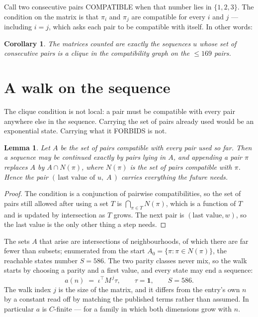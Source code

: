 \documentclass[11pt,a4paper]{article}
\theoremstyle{plain}
\newtheorem{lemma}[theorem]{Lemma}
\newtheorem{corollary}[theorem]{Corollary}
\theoremstyle{definition}
\begin{document}
Call two consecutive pairs COMPATIBLE when that number lies in $\{1,2,3\}$. The condition on the
matrix is that $\pi_i$ and $\pi_j$ are compatible for every $i$ and $j$ --- including $i=j$,
which asks each pair to be compatible with itself. In other words:

\begin{corollary}
The matrices counted are exactly the sequences $u$ whose set of consecutive pairs is a clique in
the compatibility graph on the $\le 169$ pairs.
\end{corollary}

\section{A walk on the sequence}

The clique condition is not local: a pair must be compatible with every pair anywhere else in
the sequence. Carrying the set of pairs already used would be an exponential state. Carrying
what it FORBIDS is not.

\begin{lemma}\label{lem:lump}
Let $A$ be the set of pairs compatible with every pair used so far. Then a sequence may be
continued exactly by pairs lying in $A$, and appending a pair $\pi$ replaces $A$ by
$A\cap N(\pi)$, where $N(\pi)$ is the set of pairs compatible with $\pi$. Hence the pair
$(\,\text{last value of }u,\;A\,)$ carries everything the future needs.
\end{lemma}

\begin{proof}
The condition is a conjunction of pairwise compatibilities, so the set of pairs still allowed
after using a set $T$ is $\bigcap_{\pi\in T}N(\pi)$, which is a function of $T$ and is updated
by intersection as $T$ grows. The next pair is $(\text{last value},w)$, so the last value is
the only other thing a step needs.
\end{proof}

The sets $A$ that arise are intersections of neighbourhoods, of which there are far fewer than
subsets; enumerated from the start $A_0=\{\pi:\pi\in N(\pi)\}$, the reachable states number
$S=586$. The two parity classes never mix, so the walk starts by choosing a parity and a first
value, and every state may end a sequence:
\[
a(n)\;=\;\iota^{\!\top}M^{\,j}\tau ,\qquad \tau=\mathbf{1},\qquad S=586.
\]
The walk index $j$ is the size of the matrix, and it differs from the entry's own $n$ by a
constant read off by matching the published terms rather than assumed. In particular $a$ is
$C$-finite --- for a family in which both dimensions grow with $n$.
\end{document}
